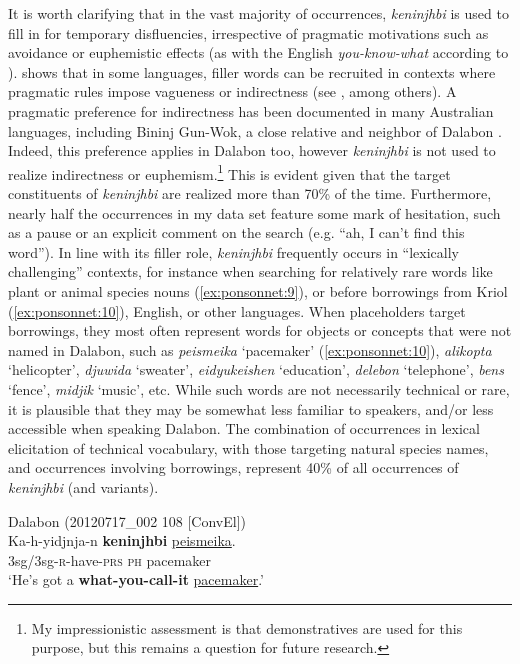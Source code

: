 \documentclass[output=paper]{langscibook}
\begin{document}
It is worth clarifying that in the vast majority of occurrences, \textit{keninjhbi} is used to fill in for temporary disfluencies, irrespective of pragmatic motivations such as avoidance or euphemistic effects (as with the English \textit{you-know-what} according to \citealt{Enfield2003}). \citet{Enfield2003} shows that in some languages, filler words can be recruited in contexts where pragmatic rules impose vagueness or indirectness (see \citealt{Seraku2024}, among others). A pragmatic preference for indirectness has been documented in many Australian languages, including Bininj Gun-Wok, a close relative and neighbor of Dalabon \citep{Garde2008}. Indeed, this preference applies in Dalabon too, however \textit{keninjhbi} is not used to realize indirectness or euphemism.\footnote{My impressionistic assessment is that demonstratives are used for this purpose, but this remains a question for future research.} This is evident given that the target constituents of \textit{keninjhbi} are realized more than 70\% of the time. Furthermore, nearly half the occurrences in my data set feature some mark of hesitation, such as a pause or an explicit comment on the search (e.g. “ah, I can’t find this word”). In line with its filler role, \textit{keninjhbi} frequently occurs in “lexically challenging” contexts, for instance when searching for relatively rare words like plant or animal species nouns (\ref{ex:ponsonnet:9}), or before borrowings from Kriol (\ref{ex:ponsonnet:10}), English, or other languages. When placeholders target borrowings, they most often represent words for objects or concepts that were not named in Dalabon, such as \textit{peismeika} ‘pacemaker’ (\ref{ex:ponsonnet:10}), \textit{alikopta} ‘helicopter’, \textit{djuwida} ‘sweater’, \textit{eidyukeishen} ‘education’, \textit{delebon} ‘telephone’, \textit{bens} ‘fence’, \textit{midjik} ‘music’, etc. While such words are not necessarily technical or rare, it is plausible that they may be somewhat less familiar to speakers, and/or less accessible when speaking Dalabon. The combination of occurrences in lexical elicitation of technical vocabulary, with those targeting natural species names, and occurrences involving borrowings, represent 40\% of all occurrences of \textit{keninjhbi} (and variants).

\ea
{\label{ex:ponsonnet:10}Dalabon (20120717\_002 108 [ConvEl])}\\
\gll Ka-h-yidjnja-n \textbf{keninjhbi} \uline{peismeika}. \\
3sg\textsc{/}3sg\textsc{{}-r-}have\textsc{{}-prs}  \textsc{ph}    pacemaker\\
\glt ‘He’s got a \textbf{what-you-call-it} \uline{pacemaker}.’
\z 
\end{document}

